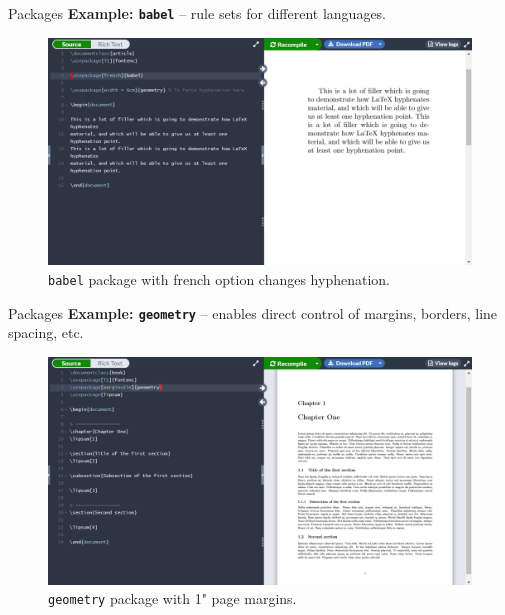 \documentclass{beamer}
\begin{document}
{  \begin{frame}{Packages}
    \textbf{Example: \texttt{babel}} -- rule sets for different languages.%
    \begin{figure}
      \includegraphics[width=0.9\linewidth]{day01-overleaf-08B-package-babel.png}
      \caption{\texttt{babel} package with french option changes hyphenation.}
      \label{fig:day01-overleaf-08B}
    \end{figure}
  \end{frame}

  \begin{frame}{Packages}
    \textbf{Example: \texttt{geometry}} -- enables direct control of margins, borders, line spacing, etc.
    \begin{figure}
      \includegraphics[width=0.9\linewidth]{day01-overleaf-08C-package-geom-redux.png}
      \caption{\texttt{geometry} package with 1" page margins.}
      \label{fig:day01-overleaf-08C}
    \end{figure}
  \end{frame}

}
\end{document}
